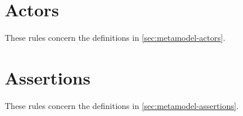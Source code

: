 \section{Actors}\label{sec:wf-actors}

These rules concern the definitions in \cref{sec:metamodel-actors}.

\section{Assertions}\label{sec:wf-assertions}

These rules concern the definitions in \cref{sec:metamodel-assertions}.


